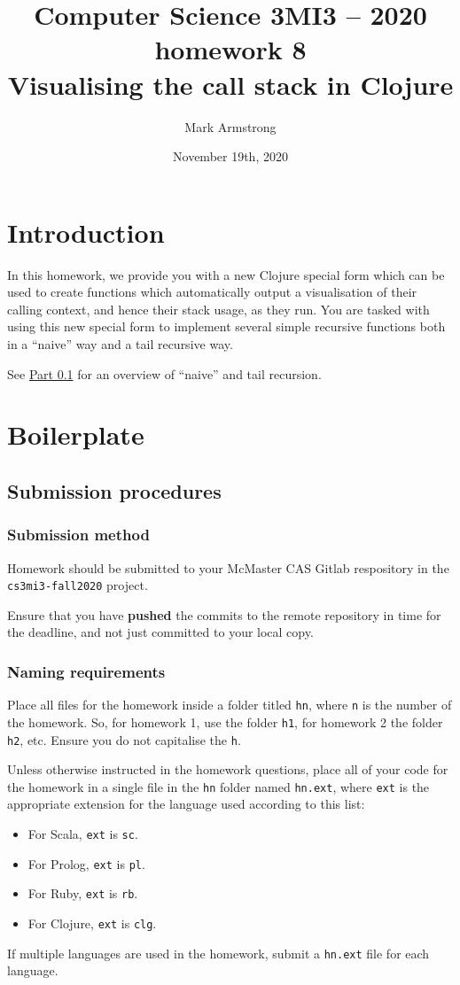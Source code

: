 \documentclass[11pt]{article}
\author{Mark Armstrong}
\date{November 19th, 2020}
\title{Computer Science 3MI3 – 2020 homework 8\\\medskip
\large Visualising the call stack in Clojure}
\begin{document}
\maketitle
\tableofcontents


\section*{Introduction}
\label{sec:orgc3d987c}
In this homework, we provide you with a new Clojure special form
which can be used to create functions
which automatically output a visualisation of their calling context,
and hence their stack usage, as they run.
You are tasked with using this new special form to implement
several simple recursive functions both in a “naive” way
and a tail recursive way.

See \hyperref[sec:org41ca887]{Part 0.1} for an overview of “naive” and tail recursion.

\section*{Boilerplate}
\label{sec:orgfaa92b4}
\subsection*{Submission procedures}
\label{sec:org95db222}
\subsubsection*{Submission method}
\label{sec:org53b7a05}

Homework should be submitted to your McMaster CAS Gitlab respository
in the \texttt{cs3mi3-fall2020} project.

Ensure that you have \textbf{pushed} the commits to the remote repository
in time for the deadline, and not just committed to your local copy.

\subsubsection*{Naming requirements}
\label{sec:org4fb5e89}

Place all files for the homework
inside a folder titled \texttt{hn}, where \texttt{n} is the number of the homework.
So, for homework 1, use the folder \texttt{h1}, for homework 2 the folder \texttt{h2}, etc.
Ensure you do not capitalise the \texttt{h}.

Unless otherwise instructed in the homework questions,
place all of your code for the homework
in a single file in the \texttt{hn} folder named \texttt{hn.ext},
where \texttt{ext} is the appropriate extension for the language used
according to this list:
\begin{itemize}
\item For Scala, \texttt{ext} is \texttt{sc}.
\item For Prolog, \texttt{ext} is \texttt{pl}.
\item For Ruby, \texttt{ext} is \texttt{rb}.
\item For Clojure, \texttt{ext} is \texttt{clg}.
\end{itemize}
If multiple languages are used in the homework,
submit a \texttt{hn.ext} file for each language.
\end{document}
